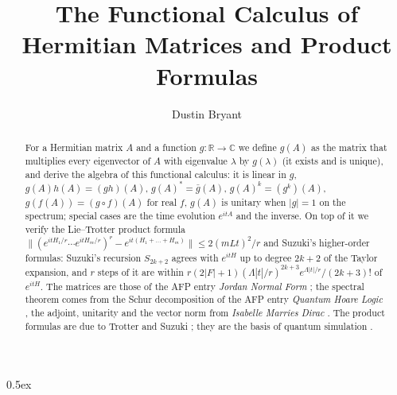 \documentclass[11pt,a4paper]{article}
\newcommand{\norm}[1]{\|#1\|}
\newcommand{\C}{\mathbb{C}}
\newcommand{\R}{\mathbb{R}}
\begin{document}
\title{The Functional Calculus of Hermitian Matrices and Product Formulas}
\author{Dustin Bryant}
\maketitle

\begin{abstract}
For a Hermitian matrix $A$ and a function $g:\R\to\C$ we define $g(A)$ as the matrix
that multiplies every eigenvector of $A$ with eigenvalue $\lambda$ by $g(\lambda)$ (it exists
and is unique), and derive the algebra of this functional calculus: it is linear in $g$,
$g(A)h(A)=(gh)(A)$, $g(A)^*=\bar g(A)$, $g(A)^k=(g^k)(A)$, $g(f(A))=(g\circ f)(A)$ for real $f$,
$g(A)$ is unitary when $|g|=1$ on the spectrum; special cases are the time evolution $e^{itA}$
and the inverse.
On top of it we verify the Lie--Trotter product formula
$\norm{(e^{itH_1/r}\cdots e^{itH_m/r})^r-e^{it(H_1+\dots+H_m)}}\le 2(mLt)^2/r$ and
Suzuki's higher-order formulas: Suzuki's recursion $S_{2k+2}$ agrees with
$e^{itH}$ up to degree $2k+2$ of the Taylor expansion, and $r$ steps of it are within
$r(2|F|+1)(\Lambda|t|/r)^{2k+3}e^{\Lambda|t|/r}/(2k+3)!$ of $e^{itH}$.  The matrices are
those of the AFP entry \emph{Jordan Normal Form} \cite{thiemann2015jnf}; the spectral
theorem comes from the Schur decomposition of the AFP entry \emph{Quantum Hoare Logic}
\cite{liu2019afp}, the adjoint, unitarity and the vector norm from
\emph{Isabelle Marries Dirac} \cite{bordg2020afp}.  The product formulas are due to
Trotter \cite{trotter1959} and Suzuki \cite{suzuki1991}; they are the basis of quantum
simulation \cite{lloyd1996,berry2007}.
\end{abstract}

\tableofcontents
\newpage

\parindent 0pt\parskip 0.5ex










\end{document}
